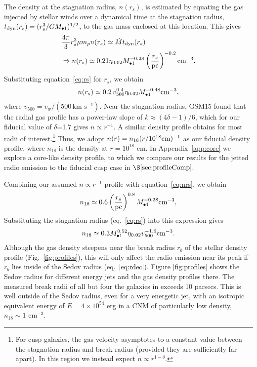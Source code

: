 \documentclass[usenatbib,fleqn]{mnras}
\newcommand{\Mbh}[1][]{M_{\bullet1}}
\newcommand{\rs}{r_s}
\begin{document}
The density at the stagnation radius, $n(\rs)$, is estimated by
equating the gas injected by stellar winds over a dynamical time at
the stagnation radius, $t_{\rm dyn} (\rs)=(\rs^3/G \Mbh)^{1/2}$, to
the gas mass enclosed at this location.  This gives
\begin{align}
  &\frac{4 \pi}{3} \rs^3 \mu m_p n(r_s) \simeq \dot{M} t_{\rm dyn}
  (\rs) \nonumber\\
  &\Rightarrow n(r_s) \simeq 0.21 \eta_{0.02} \Mbh[,7]^{-0.28} \left(\frac{r_s}{\rm
      pc}\right)^{-0.2} {\rm cm}^{-3}.
\label{eq:nrs}
\end{align}
%
Substituting equation~\eqref{eq:rs} for $r_s$, we obtain 
\begin{equation}
n(r_s) \simeq 0.2 \, v_{500}^{0.4} \eta_{0.02} \Mbh[,7]^{-0.48} {\rm cm}^{-3},
\label{eq:nrs2}
\end{equation}
where $v_{500}=v_w/\left(500 \,\mathrm{km\,\,
    s^{-1}}\right)$. 
%
Near the stagnation radius, GSM15 found that the radial gas profile
has a power-law slope of $k \approx (4\delta-1)/6$, which for our
fiducial value of $\delta$=1.7 gives $n \propto r^{-1}$.  A similar
density profile obtains for most radii of interest.\footnote{For cusp
  galaxies, the gas velocity asymptotes to a constant value between
  the stagnation radius and break radius (provided they are
  sufficiently far apart). In this region we instead expect $n\propto
  r^{1-\delta}$.}  Thus, we adopt $n(r)= n_{18} (r/10^{18} {\rm
  cm})^{-1}$ as our fiducial density profile, where $n_{18}$ is the
density at $r = 10^{18}$ cm.  In Appendix~\ref{app:core} we explore a
core-like density profile, to which we compare our results for the
jetted radio emission to the fiducial cusp case in
$\S\ref{sec:profileComp}$.

Combining our assumed $n\propto r^{-1}$ profile with
equation~\eqref{eq:nrs}, we obtain
\begin{equation}
  n_{18}\simeq 0.6 \left(\frac{r_s}{\rm pc}\right)^{0.8}
  \Mbh[,7]^{-0.28} {\rm cm^{-3}},
  \label{eq:n18}
\end{equation}
%
Substituting the stagnation radius (eq.~\ref{eq:rs}) into this
expression gives
\begin{equation}
n_{18}\simeq 0.3 \Mbh[,7]^{0.52} \eta_{0.02} v_{500}^{-1.6} {\rm
  cm^{-3}}.
\label{eq:n182}
\end{equation} 
%
Although the gas density steepens near the break radius $r_b$ of the
stellar density profile (Fig.~\ref{fig:profiles}), this will only
affect the radio emission near its peak if $r_b$ lies inside of the
Sedov radius (eq.~\ref{eq:rdec}).  Figure \ref{fig:profiles} shows the
Sedov radius for different energy jets and the gas density profiles
there.  The measured break radii of all but four the galaxies in
\citet{Lauer+2007} exceeds 10 parsecs.  This is well outside of the
Sedov radius, even for a very energetic jet, with an isotropic
equivalent energy of $E=4\times 10^{54}$ erg in a CNM of particularly
low density, $n_{18} \sim 1$ cm$^{-3}$.
\end{document}
